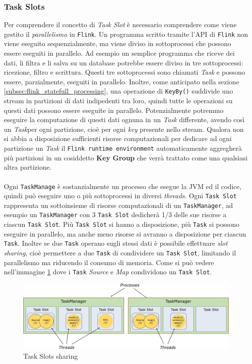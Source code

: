 \subsubsection{Task Slots}
\label{subsubsec:flink_Task_slots}
Per comprendere il concetto di \textit{Task Slot} è necessario comprendere come viene gestito il \textit{parallelismo} in \texttt{Flink}.    
Un programma scritto tramite l'API di \texttt{Flink} non viene eseguito sequenzialmente, ma viene diviso in sottoprocessi che possono essere eseguiti in parallelo.
Ad esempio un semplice programma che riceve dei dati, li filtra e li salva su un database potrebbe essere diviso in tre sottoprocessi: ricezione, filtro e scrittura.
Questi tre sottoprocessi sono chiamati \textit{Task} e possono essere, parzialmente, eseguiti in parallelo.
Inoltre, come anticipato nella sezione \ref{subsec:flink_statefull_processing}, una operazione di \texttt{KeyBy()} suddivide uno stream in partizioni di dati
indipedenti tra loro, quindi tutte le operazioni su questi dati possono essere eseguite in parallelo.
Potenzialmente potremmo eseguire la computazione di questi dati ognuna in un \textit{Task} differente, avendo così un \textit{Task}per ogni partizione,
cioè per ogni \textit{key} presente nello stream.
Qualora non si abbia a disposizione sufficienti risorse computazionali per dedicare ad ogni partizione un \textit{Task} il \texttt{Flink runtime environment} 
automaticamente aggregherà più partizioni in un cosiddetto \textbf{Key Group} che verrà trattato come una qualsiasi altra partizione.
\\\\
Ogni \texttt{TaskManage} è sostanzialmente un processo che esegue la JVM ed il codice, quindi può eseguire uno o più sottoprocessi in diversi \textit{threads}.
Ogni \texttt{Task Slot} rappresenta un sottoinsieme di risorse computazionali di un \texttt{TaskManager}, ad esempio un \texttt{TaskManager}
con 3 \texttt{Task Slot} dedicherà 1/3 delle sue risorse a ciascun \texttt{Task Slot}.
Più \texttt{Task Slot} si hanno a disposizione, più \texttt{Task} si possono eseguire in parallelo, ma anche meno risorse si avranno a disposizione per ciascun \texttt{Task}.
Inoltre se due \texttt{Task} operano sugli stessi dati è possibile effettuare \textit{slot sharing}, cioè permettere a due \texttt{Task} di condividere un \texttt{Task Slot}, limitando il parallelismo ma riducendo il consumo di memoria.
Come si può vedere nell'immagine \ref{fig:flink_slots} dove i \texttt{Task} \textit{Source} e \textit{Map} condividono un \texttt{Task Slot}.
\begin{figure}[htbp]
    \centering
    \includegraphics[width=\textwidth]{images/flink/Tasks_slots.jpg}
    \caption{Task Slots sharing}
    \label{fig:flink_slots}
\end{figure}